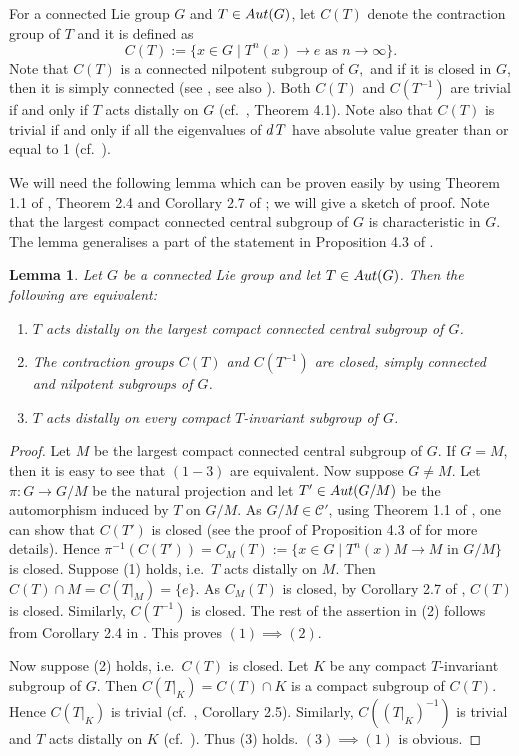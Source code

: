 \documentclass{amsart}
\numberwithin{equation}{section}
\newcommand{\Aut}{{\rm Aut}}
\newcommand{\du}{{\rm d\,}}
\newtheorem{lem}[thm]{Lemma}
\theoremstyle{remark}
\newcommand{\cp}{{\mathcal{C}'}}
\begin{document}
For a connected Lie group $G$ and $T\in\Aut(G)$, let $C(T)$ denote the contraction group of $T$ 
and it is defined as 
$$
C(T):=\{x\in G\mid T^n(x)\to e\mbox{ as } n\to\infty\}.$$ 
Note that $C(T)$ is a connected nilpotent subgroup of $G,$ and if it is closed in $G$, then it is simply 
connected (see \cite{Si}, see also \cite{HSi}). Both $C(T)$ and $C(T^{-1})$ are trivial 
if and only if $T$ acts distally on $G$ (cf.\  \cite{RS2}, Theorem 4.1). Note also that $C(T)$ is 
trivial if and only if all the eigenvalues of $\du T$ have absolute value greater than or equal to 1 
(cf.\ \cite{RS2, Ab2}). 

We will need the following lemma which can be proven easily by using Theorem 1.1 of \cite{DS1}, 
 Theorem 2.4 and Corollary 2.7 of \cite{HSi}; we will give a sketch of proof. Note that the largest compact 
 connected central subgroup of $G$ is characteristic in $G$. The lemma generalises a part of the 
 statement in Proposition 4.3 of \cite{RS2}.
  
 \begin{lem} \label{ct-closed}
 Let $G$ be a connected Lie group and let $T\in\Aut(G)$. Then the following are equivalent:
 \begin{enumerate}
 \item $T$ acts distally on the largest compact connected central subgroup of $G$.
 \item The contraction groups $C(T)$ and $C(T^{-1})$ are closed, simply connected and nilpotent subgroups of $G$. 
 \item $T$ acts distally on every compact $T$-invariant subgroup of $G$. 
 \end{enumerate}
 \end{lem}
 
 \begin{proof} Let $M$ be the largest compact connected central subgroup of $G$. If $G=M$, then it is easy to see that 
 $(1-3)$ are equivalent. Now suppose $G\ne M$. Let $\pi:G\to G/M$ be 
 the natural projection and let $T'\in \Aut(G/M)$ be the automorphism induced by $T$ on $G/M$. 
 As $G/M\in\cp$, using Theorem 1.1 of \cite{DS1}, 
 one can show that $C(T')$ is closed (see the proof of Proposition 4.3 of \cite{RS2} for more details). Hence 
 $\pi^{-1}(C(T'))=C_M(T):=\{x\in G\mid T^n(x)M\to M\mbox{ in }G/M\}$ is closed. 
  Suppose (1) holds, i.e.\ $T$ acts distally on $M$. Then $C(T)\cap M=C(T|_M)=\{e\}$. 
  As $C_M(T)$ is closed, by Corollary 2.7 of \cite{HSi}, $C(T)$ is closed. Similarly, $C(T^{-1})$ is
 closed. The rest of the assertion in (2) follows from Corollary 2.4 in \cite{Si}.
 This proves $(1)\implies (2)$. 
 
 Now suppose (2) holds, i.e.\ $C(T)$ is closed. Let $K$ be any compact $T$-invariant subgroup of $G$. 
 Then $C(T|_K)=C(T)\cap K$ is a compact subgroup of $C(T)$. Hence $C(T|_K)$ is trivial 
 (cf.\ \cite{HSi}, Corollary 2.5). Similarly, $C((T|_K)^{-1})$ is trivial and $T$ acts 
 distally on $K$ (cf.\ \cite{Ja}). Thus (3) holds. $(3)\implies (1)$ is obvious. 
 \end{proof}
\end{document}

